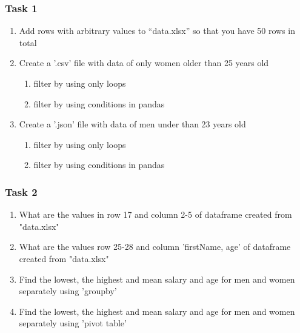 \documentclass{beamer}
\begin{document}
\begin{frame}
    \frametitle{Task 1}
    \begin{enumerate}
        \item Add rows with arbitrary values to “data.xlsx” so that you have 50 rows in total
        \item Create a '.csv' file with data of only women older than 25 years old
            \begin{enumerate}
                \item filter by using only loops
                \item filter by using conditions in pandas 
            \end{enumerate}
        \item Create a '.json' file with data of men under than 23 years old
            \begin{enumerate}
                \item filter by using only loops
                \item filter by using conditions in pandas 
            \end{enumerate}
    \end{enumerate}
\end{frame}

\begin{frame}
    \frametitle{Task 2}
    \begin{enumerate}
        \item What are the values in row 17 and column 2-5 of dataframe created from "data.xlsx"
        \item What are the values row 25-28 and column 'firstName, age' of dataframe created from "data.xlsx"
        \item Find the lowest, the highest and mean salary and age for men and women separately using 'groupby'
        \item Find the lowest, the highest and mean salary and age for men and women separately using 'pivot table'
    \end{enumerate}
\end{frame}

\end{document}
